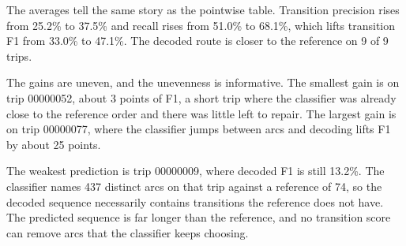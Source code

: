 \documentclass[11pt,a4paper]{article}
\begin{document}
\begin{table}[H]
\centering
\caption{Route-level agreement on the student-test trips. Pairs are consecutive arcs in the
deduplicated sequence, so a repeated arc is counted once.}
\label{tab:sequence}
\footnotesize
{}
\end{table}

The averages tell the same story as the pointwise table. Transition precision rises from 25.2\% to 37.5\% and recall rises from 51.0\% to 68.1\%, which lifts transition F1 from 33.0\% to 47.1\%. The decoded route is closer to the reference on 9 of 9 trips.

The gains are uneven, and the unevenness is informative. The smallest gain is on trip 00000052, about 3 points of F1, a short trip where the classifier was already close to the reference
order and there was little left to repair. The largest gain is on trip 00000077, where the classifier jumps between arcs and decoding lifts F1 by about 25 points.

The weakest prediction is trip 00000009, where decoded F1 is still 13.2\%. The classifier names 437 distinct arcs on that trip against a reference of 74, so the decoded sequence necessarily contains transitions the reference does not have.
The predicted sequence is far longer than the reference, and no transition score can remove arcs that
the classifier keeps choosing.
\end{document}
